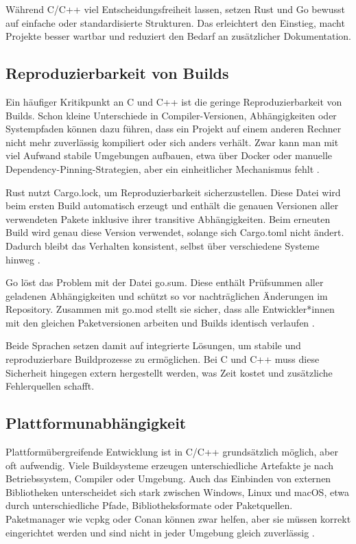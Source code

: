 Während C/C++ viel Entscheidungsfreiheit lassen, setzen Rust und Go bewusst auf einfache oder standardisierte Strukturen. 
Das erleichtert den Einstieg, macht Projekte besser wartbar und reduziert den Bedarf an zusätzlicher Dokumentation.

\subsection{Reproduzierbarkeit von Builds}
\label{subsec:Reproduzierbarkeit_von_Builds}

Ein häufiger Kritikpunkt an C und C++ ist die geringe Reproduzierbarkeit von Builds. 
Schon kleine Unterschiede in Compiler-Versionen, Abhängigkeiten oder Systempfaden können dazu führen, 
dass ein Projekt auf einem anderen Rechner nicht mehr zuverlässig kompiliert oder sich anders verhält. 
Zwar kann man mit viel Aufwand stabile Umgebungen aufbauen, etwa über Docker oder manuelle Dependency-Pinning-Strategien, 
aber ein einheitlicher Mechanismus fehlt \autocite{SurprisinglyComplexWorld}.

Rust nutzt Cargo.lock, um Reproduzierbarkeit sicherzustellen. Diese Datei wird beim ersten Build automatisch erzeugt 
und enthält die genauen Versionen aller verwendeten Pakete inklusive ihrer transitive Abhängigkeiten. 
Beim erneuten Build wird genau diese Version verwendet, solange sich Cargo.toml nicht ändert. 
Dadurch bleibt das Verhalten konsistent, selbst über verschiedene Systeme hinweg \autocite{HelloCargoRust}.

Go löst das Problem mit der Datei go.sum. Diese enthält Prüfsummen aller geladenen Abhängigkeiten und 
schützt so vor nachträglichen Änderungen im Repository. Zusammen mit go.mod stellt sie sicher, 
dass alle Entwickler*innen mit den gleichen Paketversionen arbeiten und Builds identisch verlaufen \autocite{ManagingDependenciesGo,UnderstandingGoModulesBeginners}.

Beide Sprachen setzen damit auf integrierte Lösungen, um stabile und reproduzierbare Buildprozesse zu ermöglichen. 
Bei C und C++ muss diese Sicherheit hingegen extern hergestellt werden, was Zeit kostet und zusätzliche Fehlerquellen schafft.

\subsection{Plattformunabhängigkeit}
\label{subsec:Plattformunabhaengigkeit}

Plattformübergreifende Entwicklung ist in C/C++ grundsätzlich möglich, aber oft aufwendig. 
Viele Buildsysteme erzeugen unterschiedliche Artefakte je nach Betriebssystem, Compiler oder Umgebung. 
Auch das Einbinden von externen Bibliotheken unterscheidet sich stark zwischen Windows, Linux und macOS, 
etwa durch unterschiedliche Pfade, Bibliotheksformate oder Paketquellen. 
Paketmanager wie vcpkg oder Conan können zwar helfen, aber sie müssen korrekt eingerichtet werden 
und sind nicht in jeder Umgebung gleich zuverlässig \autocite{NotesPackageManagement,tangUnderstandingThirdpartyLibrary2022}.

